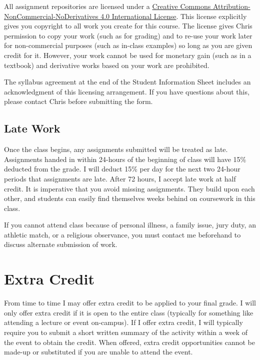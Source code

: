 \documentclass[
]{book}
\begin{document}
All assignment repositories are licensed under a \href{https://creativecommons.org/licenses/by-nc-nd/4.0/}{Creative Commons Attribution-NonCommercial-NoDerivatives 4.0 International License}. This license explicitly gives you copyright to all work you create for this course. The license gives Chris permission to copy your work (such as for grading) and to re-use your work later for non-commercial purposes (such as in-class examples) so long as you are given credit for it. However, your work cannot be used for monetary gain (such as in a textbook) and derivative works based on your work are prohibited.

The syllabus agreement at the end of the Student Information Sheet includes an acknowledgment of this licensing arrangement. If you have questions about this, please contact Chris before submitting the form.

\hypertarget{late-work}{%
\subsection{Late Work}\label{late-work}}

Once the class begins, any assignments submitted will be treated as late. Assignments handed in within 24-hours of the beginning of class will have 15\% deducted from the grade. I will deduct 15\% per day for the next two 24-hour periods that assignments are late. After 72 hours, I accept late work at half credit. It is imperative that you avoid missing assignments. They build upon each other, and students can easily find themselves weeks behind on coursework in this class.

If you cannot attend class because of personal illness, a family issue, jury duty, an athletic match, or a religious observance, you must contact me beforehand to discuss alternate submission of work.

\hypertarget{extra-credit}{%
\section{Extra Credit}\label{extra-credit}}

From time to time I may offer extra credit to be applied to your final grade. I will only offer extra credit if it is open to the entire class (typically for something like attending a lecture or event on-campus). If I offer extra credit, I will typically require you to submit a short written summary of the activity within a week of the event to obtain the credit. When offered, extra credit opportunities cannot be made-up or substituted if you are unable to attend the event.
\end{document}
